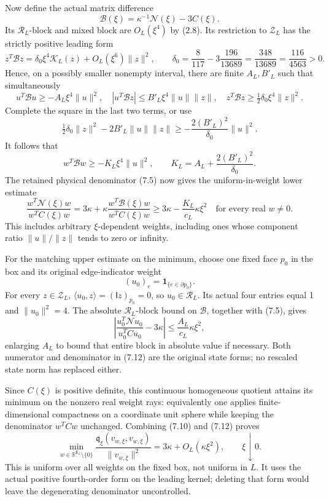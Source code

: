 \documentclass[
  11pt,
]{article}
\begin{document}
Now define the actual matrix difference \[
\mathcal B(\xi)=\kappa^{-1}\mathcal N(\xi)-3C(\xi).
\tag{7.6}
\] Its \(\mathscr R_L\)-block and mixed block are \(O_L(\xi^4)\) by
(2.8). Its restriction to \(\mathscr Z_L\) has the strictly positive
leading form \[
z^T\mathcal Bz=\delta_0\xi^4\mathcal K_L(z)+O_L(\xi^6)\|z\|^2,
\qquad
\delta_0=\frac8{117}-3\frac{196}{13689}
=\frac{348}{13689}=\frac{116}{4563}>0.
\tag{7.7}
\] Hence, on a possibly smaller nonempty interval, there are finite
\(A_L,B'_L\) such that simultaneously \[
u^T\mathcal Bu\ge-A_L\xi^4\|u\|^2,\quad
|u^T\mathcal Bz|\le B'_L\xi^4\|u\|\|z\|,\quad
z^T\mathcal Bz\ge\tfrac12\delta_0\xi^4\|z\|^2.
\tag{7.8}
\] Complete the square in the last two terms, or use \[
\tfrac12\delta_0\|z\|^2-2B'_L\|u\|\|z\|
\ge-\frac{2(B'_L)^2}{\delta_0}\|u\|^2.
\] It follows that \[
w^T\mathcal Bw\ge-K_L\xi^4\|u\|^2,\qquad
K_L=A_L+\frac{2(B'_L)^2}{\delta_0}.
\tag{7.9}
\] The retained physical denominator (7.5) now gives the
uniform-in-weight lower estimate \[
\boxed{
\frac{w^T\mathcal N(\xi)w}{w^TC(\xi)w}
=3\kappa+\kappa\frac{w^T\mathcal B(\xi)w}{w^TC(\xi)w}
\ge3\kappa-\frac{K_L}{c_L}\kappa\xi^2
\quad\text{for every real }w\ne0.}
\tag{7.10}
\] This includes arbitrary \(\xi\)-dependent weights, including ones
whose component ratio \(\|u\|/\|z\|\) tends to zero or infinity.

For the matching upper estimate on the minimum, choose one fixed face
\(p_0\) in the box and its original edge-indicator weight \[
(u_0)_e=\mathbf1_{\{e\in\partial p_0\}}.
\tag{7.11}
\] For every \(z\in\mathscr Z_L\),
\(\langle u_0,z\rangle=(\mathsf Iz)_{p_0}=0\), so
\(u_0\in\mathscr R_L\). Its actual four entries equal 1 and
\(\|u_0\|^2=4\). The absolute \(\mathscr R_L\)-block bound on
\(\mathcal B\), together with (7.5), gives \[
\left|\frac{u_0^T\mathcal N u_0}{u_0^TCu_0}-3\kappa\right|
\le\frac{A_L}{c_L}\kappa\xi^2,
\tag{7.12}
\] enlarging \(A_L\) to bound that entire block in absolute value if
necessary. Both numerator and denominator in (7.12) are the original
state forms; no rescaled state norm has replaced either.

Since \(C(\xi)\) is positive definite, this continuous homogeneous
quotient attains its minimum on the nonzero real weight rays:
equivalently one applies finite-dimensional compactness on a coordinate
unit sphere while keeping the denominator \(w^TCw\) unchanged. Combining
(7.10) and (7.12) proves \[
\boxed{
\min_{w\in\mathbb R^{\mathsf E_L}\setminus\{0\}}
\frac{\mathfrak q_\xi(v_{w,\xi},v_{w,\xi})}{\|v_{w,\xi}\|^2}
=3\kappa+O_L(\kappa\xi^2),\qquad \xi\downarrow0.}
\tag{7.13}
\] This is uniform over all weights on the fixed box, not uniform in
\(L\). It uses the actual positive fourth-order form on the leading
kernel; deleting that form would leave the degenerating denominator
uncontrolled.
\end{document}
